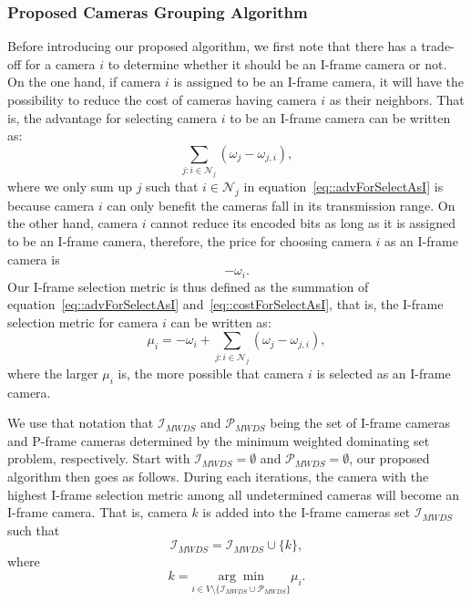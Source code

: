\subsubsection{Proposed Cameras Grouping Algorithm}
Before introducing our proposed algorithm, we first note that there has a trade-off for a camera $i$ to determine whether it should be an I-frame camera or not.
On the one hand, if camera $i$ is assigned to be an I-frame camera, it will have the possibility to reduce the cost of cameras having camera $i$ as their neighbors.
That is, the advantage for selecting camera $i$ to be an I-frame camera can be written as:
\begin{equation}
\sum_{j:i \in \mathcal{N}_j} \left( \omega_j - \omega_{j,i} \right),
\label{eq::advForSelectAsI}
\end{equation}
where we only sum up $j$ such that $i \in \mathcal{N}_j$ in equation~\eqref{eq::advForSelectAsI} is because camera $i$ can only benefit the cameras fall in its transmission range.
On the other hand, camera $i$ cannot reduce its encoded bits as long as it is assigned to be an I-frame camera, therefore, the price for choosing camera $i$ as an I-frame camera is
\begin{equation}
- \omega_i.
\label{eq::costForSelectAsI}
\end{equation}
Our I-frame selection metric is thus defined as the summation of equation~\eqref{eq::advForSelectAsI} and~\eqref{eq::costForSelectAsI}, that is, the I-frame selection metric for camera $i$ can be written as:
\begin{equation}
\mu_i = - \omega_i + \sum_{j:i \in \mathcal{N}_j} \left( \omega_j - \omega_{j,i} \right),
\label{eq::IFrameSelectionMetric}
\end{equation}
where the larger $\mu_i$ is, the more possible that camera $i$ is selected as an I-frame camera.

We use that notation that $\mathcal{I}_{MWDS}$ and $\mathcal{P}_{MWDS}$ being the set of I-frame cameras and P-frame cameras determined by the minimum weighted dominating set problem, respectively.
Start with $\mathcal{I}_{MWDS} = \emptyset$ and $\mathcal{P}_{MWDS} = \emptyset$, our proposed algorithm then goes as follows.
During each iterations, the camera with the highest I-frame selection metric among all undetermined cameras will become an I-frame camera.
That is, camera $k$ is added into the I-frame cameras set $\mathcal{I}_{MWDS}$ such that
\begin{equation}
\mathcal{I}_{MWDS} = \mathcal{I}_{MWDS} \cup \{ k \},
\label{eq::updateICamsSet}
\end{equation}
where
\begin{equation}
k = \underset{i \in V \setminus \{ \mathcal{I}_{MWDS} \cup \mathcal{P}_{MWDS} \} }{\arg \min} \mu_i.
\end{equation}

